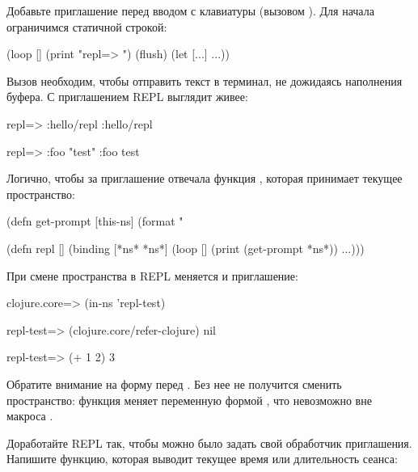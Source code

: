 Добавьте приглашение перед вводом с клавиатуры (вызовом ). Для начала ограничимся статичной строкой:

\begin{english}
  \begin{clojure}
(loop []
  (print "repl=> ")
  (flush)
  (let [...]
    ...))
  \end{clojure}
\end{english}

Вызов  необходим, чтобы отправить текст в терминал, не дожидаясь наполнения буфера. С приглашением REPL выглядит живее:

\begin{english}
  \begin{clojure}
repl=> :hello/repl
:hello/repl

repl=> {:foo "test"}
{:foo test}
  \end{clojure}
\end{english}

Логично, чтобы за приглашение отвечала функция , которая принимает текущее пространство:

\begin{english}
  \begin{clojure/lines}
(defn get-prompt [this-ns]
  (format "%

(defn repl []
  (binding [*ns* *ns*]
    (loop []
      (print (get-prompt *ns*))
      ...)))
  \end{clojure/lines}
\end{english}

При смене пространства в REPL меняется и приглашение:

\begin{english}
  \begin{clojure}
clojure.core=> (in-ns 'repl-test)

repl-test=> (clojure.core/refer-clojure)
nil

repl-test=> (+ 1 2)
3
  \end{clojure}
\end{english}

Обратите внимание на форму  перед  . Без нее не получится сменить пространство: функция  меняет переменную  формой , что невозможно вне макроса .

Доработайте REPL так, чтобы можно было задать свой обработчик приглашения. Напишите функцию, которая выводит текущее время или длительность сеанса:

